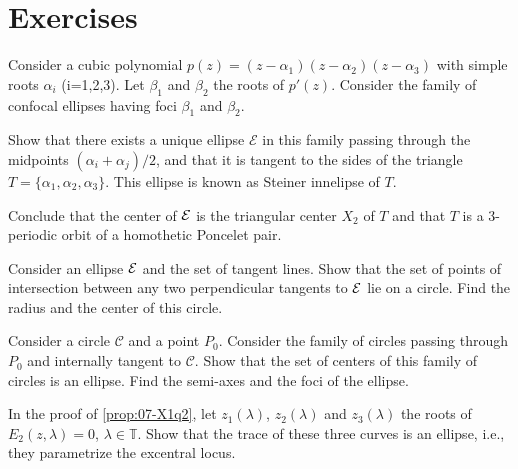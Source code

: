 \section{Exercises}
\label{sec:07-exercises}

\begin{exercise}
Consider a cubic polynomial $p(z)=(z-\alpha_1)(z-\alpha_2)(z-\alpha_3)$ with simple roots $\alpha_i$ (i=1,2,3).
Let $\beta_1$ and $\beta_2$ the roots of $p'(z)$.
Consider the family of confocal ellipses having foci $\beta_1$ and $\beta_2$.

Show that there exists a unique ellipse $\mathcal E$ in this family passing through the midpoints $(\alpha_i+\alpha_j)/2$, and that it is tangent to the sides of the triangle $T=\{\alpha_1,\alpha_2,\alpha_3\}$. This ellipse is known as Steiner innelipse of $T$.

Conclude that the center of $\mathcal{E}$ is the triangular center  $X_2$ of $T$ and that $T$ is a 3-periodic orbit of a homothetic Poncelet pair.


\end{exercise}

\begin{exercise} Consider an ellipse $\mathcal{E}$ and the set of tangent lines. Show that the set of points of intersection between any two perpendicular
tangents to $\mathcal{E}$  lie on a circle. Find the radius and the center of this circle.
\end{exercise}

\begin{exercise}
Consider a circle $\mathcal{C}$ and a point $P_0$.   Consider the family of circles passing through $P_0$ and internally tangent to $\mathcal{C}$. Show that the set of centers of this family of circles is an ellipse.
Find the semi-axes and the foci of the ellipse.
\end{exercise}

\begin{exercise}
In the proof of \cref{prop:07-X1q2}, let $z_1(\lambda)$, $ z_2(\lambda) $ and $z_3(\lambda)$ the roots of   $E_2(z,\lambda)=0$, $\lambda \in \mathbb{T}$. Show that  the trace of these three curves is an ellipse, i.e., they parametrize the excentral locus.   
\end{exercise}